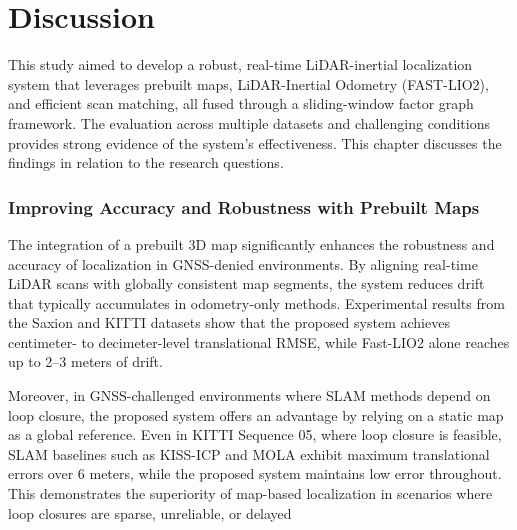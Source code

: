 \chapter{Discussion}
\label{ch:discu}

This study aimed to develop a robust, real-time LiDAR-inertial localization system that leverages prebuilt maps, LiDAR-Inertial Odometry (FAST-LIO2), and efficient scan matching, all fused through a sliding-window factor graph framework. The evaluation across multiple datasets and challenging conditions provides strong evidence of the system’s effectiveness. This chapter discusses the findings in relation to the research questions.


\subsection{Improving Accuracy and Robustness with Prebuilt Maps}

The integration of a prebuilt 3D map significantly enhances the robustness and accuracy of localization in GNSS-denied environments. By aligning real-time LiDAR scans with globally consistent map segments, the system reduces drift that typically accumulates in odometry-only methods. Experimental results from the Saxion and KITTI datasets show that the proposed system achieves centimeter- to decimeter-level translational RMSE, while Fast-LIO2 alone reaches up to 2–3 meters of drift.

Moreover, in GNSS-challenged environments where SLAM methods depend on loop closure, the proposed system offers an advantage by relying on a static map as a global reference. Even in KITTI Sequence 05, where loop closure is feasible, SLAM baselines such as KISS-ICP and MOLA exhibit maximum translational errors over 6 meters, while the proposed system maintains low error throughout. This demonstrates the superiority of map-based localization in scenarios where loop closures are sparse, unreliable, or delayed